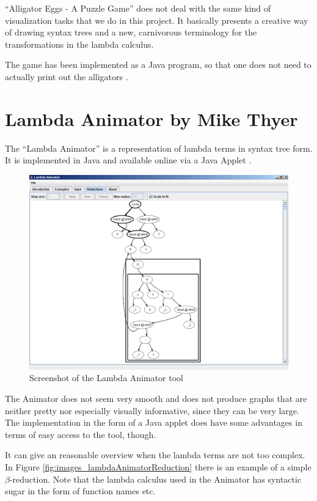 ``Alligator Eggs - A Puzzle Game'' does not deal with the same kind of
visualization tasks that we do in this project. It basically presents a
creative way of drawing syntax trees and a new, carnivorous terminology for
the transformations in the lambda calculus. 

The game has been implemented as a Java program, so that one does not need to
actually print out the alligators \cite{AlligatorTool}.

\section{Lambda Animator by Mike Thyer}

The ``Lambda Animator'' is a representation of lambda terms in syntax tree form. It
is implemented in Java and available online via a Java Applet
\cite{lambdaAnimatorThyer}.

\begin{figure}[!htbp]
	\centering
		\includegraphics[scale=0.1]{../images/lambdaAnimator.png}
	\caption{Screenshot of the Lambda Animator tool}
	\label{fig:images_lambdaAnimator}
\end{figure}

The Animator does not seem very smooth and does not produce graphs that are
neither pretty nor especially visually informative, since they can be very
large. The implementation in the form of a Java applet does have some
advantages in terms of easy access to the tool, though.

It can give an reasonable overview when the lambda terms are not too complex.
In Figure \ref{fig:images_lambdaAnimatorReduction} there is an example of a
simple $\beta$-reduction. Note that the lambda calculus used in the Animator
has syntactic sugar in the form of function names etc.

